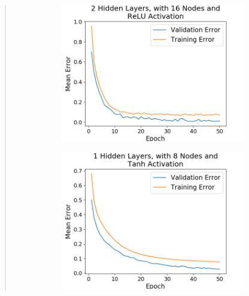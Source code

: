 \documentclass{article}
\begin{document}
\begin{quote}
\begin{figure}[h]
\begin{subfigure}[h]{0.23\textwidth}
		\includegraphics[width=\textwidth]{figs/Iris_Multiclass_Classification_2_Hidden_Layers_with_16_Nodes_and_ReLU_Activation.png}
	\end{subfigure}
\end{figure}	
\begin{figure}[h!]
	\centering
	\begin{subfigure}[h]{0.23\textwidth}
		\includegraphics[width=\textwidth]{figs/Iris_Multiclass_Classification_1_Hidden_Layers_with_8_Nodes_and_Tanh_Activation.png}
	\end{subfigure}
	\begin{subfigure}[h]{0.23\textwidth}

\end{subfigure}
\end{figure}
\end{quote}
\end{document}
